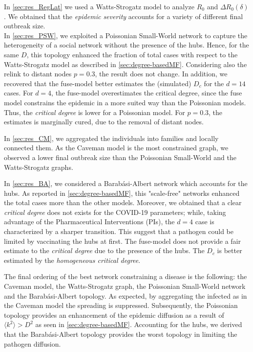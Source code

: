 \documentclass[a4paper,10pt]{book} %
\theoremstyle{definition}
\begin{document}
In \autoref{sec:res_RegLat} we used a Watts-Strogatz model to analyze $ R_0$ and $ \Delta R_0 (\delta)$. We obtained that the \textit{epidemic severity} accounts for a variety of different final outbreak size.\\
In \autoref{sec:res_PSW}, we exploited a Poissonian Small-World network to capture the heterogeneity of a social network without the presence of the hubs. Hence, for the same $ D$, this topology enhanced the fraction of total cases with respect to the Watts-Strogatz model as described in \autoref{sec:degree-basedMF}. 
Considering also the relink to distant nodes $ p = 0.3$, the result does not change.
In addition, we recovered that the fuse-model better estimates the (simulated) $ D_c$ for the $ d = 14$ cases. For $d=4$, the fuse-model overestimates the critical degree, since the fuse model constrains the epidemic in a more suited way than the Poissonian models. Thus, the \textit{critical degree} is lower for a Poissonian model. For $ p = 0.3$, the estimates is marginally cured, due to the removal of distant nodes. 

In \autoref{sec:res_CM}, we aggregated the individuals into families and locally connected them.
As the Caveman model is the most constrained graph, we observed a lower final outbreak size than the Poissonian Small-World and the Watts-Strogatz graphs.

In \autoref{sec:res_BA}, we considered a Barabási-Albert network which accounts for the hubs. As reported in \autoref{sec:degree-basedMF}, this "scale-free" networks enhanced the total cases more than the other models. 
Moreover, we obtained that a clear \textit{critical degree} does not exists for the COVID-19 parameters; while, taking advantage of the Pharmaceutical Interventions (PIs), the $d = 4$ case is characterized by a sharper transition. This suggest that a pathogen could be limited by vaccinating the hubs at first.
The fuse-model does not provide a fair estimate to the \textit{critical degree} due to the presence of the hubs. The $ D_c$ is better estimated by the \textit{homogeneous critical degree}. 

The final ordering of the best network constraining a disease is the following: the Caveman model, the Watts-Strogatz graph, the Poissonian Small-World network and the Barabási-Albert topology. As expected, by aggregating the infected as in the Caveman model the spreading is suppressed. Subsequently, the Poissonian topology provides an enhancement of the epidemic diffusion as a result of $ \langle k^2 \rangle > D^{2}$ as seen in \autoref{sec:degree-basedMF}. Accounting for the hubs, we derived that the Barabási-Albert topology provides the worst topology in limiting the pathogen diffusion.
\end{document}
